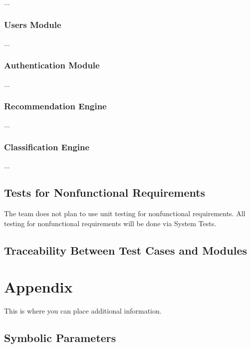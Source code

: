\documentclass[12pt, titlepage]{article}
\begin{document}
...

\subsubsection{Users Module}

...

\subsubsection{Authentication Module}

...

\subsubsection{Recommendation Engine}

...

\subsubsection{Classification Engine}

...

\subsection{Tests for Nonfunctional Requirements}

The team does not plan to use unit testing for nonfunctional requirements. All testing for
nonfunctional requirements will be done via System Tests.

\subsection{Traceability Between Test Cases and Modules}

				




\newpage

\section{Appendix}

This is where you can place additional information.

\subsection{Symbolic Parameters}
\end{document}
